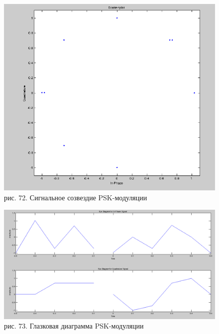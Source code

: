 \documentclass[10pt,a4paper]{report}
\begin{document}
\begin{figure}
\begin{center}
\includegraphics[width=150mm, scale = 0.9]{9_5}\newline
рис. 72. Сигнальное созвездие PSK-модуляции\newline
\end{center}
\end{figure}
\begin{figure}
\begin{center}
\includegraphics[width=150mm, scale = 0.9]{9_6}\newline
рис. 73. Глазковая диаграмма PSK-модуляции\newline
\end{center}
\end{figure}
\end{document}
